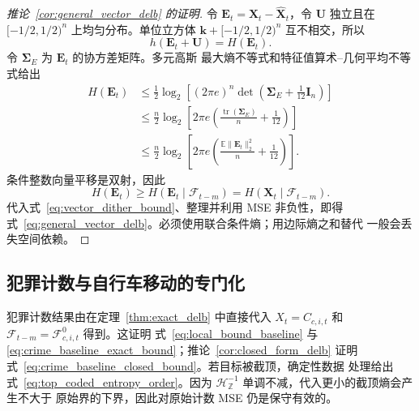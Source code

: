 \begin{proof}[推论~\ref{cor:general_vector_delb} 的证明]
令 \(\mathbf E_t=\mathbf X_t-\widehat{\mathbf X}_t\)，令
\(\mathbf U\) 独立且在 \([-1/2,1/2)^n\) 上均匀分布。单位立方体
\(\mathbf k+[-1/2,1/2)^n\) 互不相交，所以
\[
h(\mathbf{E}_t+\mathbf{U})=H(\mathbf{E}_t).
\]
令 \(\boldsymbol\Sigma_E\) 为 \(\mathbf E_t\) 的协方差矩阵。多元高斯
最大熵不等式和特征值算术--几何平均不等式给出
\begin{align}
H(\mathbf{E}_t)
&\leq
\frac{1}{2}\log_2\!\left[
(2\pi e)^n
\det\!\left(\boldsymbol{\Sigma}_E+\frac{1}{12}\mathbf{I}_n\right)
\right]
\nonumber\\
&\leq
\frac{n}{2}\log_2\!\left[
2\pi e
\left(
\frac{\operatorname{tr}(\boldsymbol{\Sigma}_E)}{n}
+
\frac{1}{12}
\right)
\right]
\nonumber\\
&\leq
\frac{n}{2}\log_2\!\left[
2\pi e
\left(
\frac{\mathbb{E}\|\mathbf{E}_t\|_2^2}{n}
+
\frac{1}{12}
\right)
\right].
\label{eq:vector_dither_bound}
\end{align}
条件整数向量平移是双射，因此
\[
H(\mathbf{E}_t)
\geq
H(\mathbf{E}_t\mid\mathcal{F}_{t-m})
=
H(\mathbf{X}_t\mid\mathcal{F}_{t-m}).
\]
代入式~\eqref{eq:vector_dither_bound}、整理并利用 MSE 非负性，即得
式~\eqref{eq:general_vector_delb}。必须使用联合条件熵；用边际熵之和替代
一般会丢失空间依赖。
\end{proof}

\subsection{犯罪计数与自行车移动的专门化}

犯罪计数结果由在定理~\ref{thm:exact_delb} 中直接代入
\(X_t=C_{c,i,t}\) 和
\(\mathcal F_{t-m}=\mathcal F^0_{c,i,t}\) 得到。这证明
式~\eqref{eq:local_bound_baseline} 与
\eqref{eq:crime_baseline_exact_bound}；推论~\ref{cor:closed_form_delb}
证明式~\eqref{eq:crime_baseline_closed_bound}。若目标被截顶，确定性数据
处理给出式~\eqref{eq:top_coded_entropy_order}。因为
\(\mathcal H_{\mathbb Z}^{-1}\) 单调不减，代入更小的截顶熵会产生不大于
原始界的下界，因此对原始计数 MSE 仍是保守有效的。

